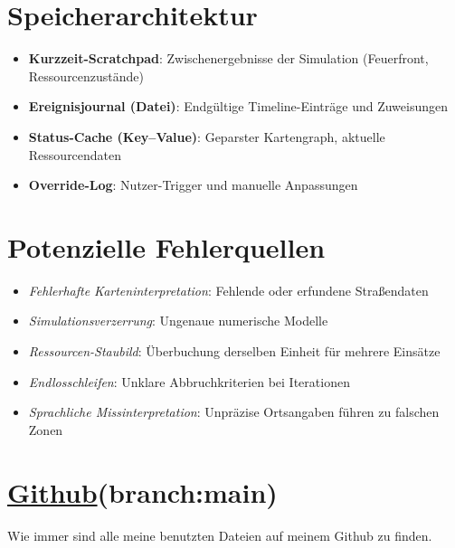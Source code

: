 \documentclass[a4paper,12pt]{scrartcl}
\begin{document}
\section{Speicherarchitektur}
\begin{itemize}
  \item \textbf{Kurzzeit-Scratchpad}: Zwischenergebnisse der Simulation (Feuerfront, Ressourcenzustände)
  \item \textbf{Ereignisjournal (Datei)}: Endgültige Timeline-Einträge und Zuweisungen
  \item \textbf{Status-Cache (Key–Value)}: Geparster Kartengraph, aktuelle Ressourcendaten
  \item \textbf{Override-Log}: Nutzer-Trigger und manuelle Anpassungen
\end{itemize}

\section{Potenzielle Fehlerquellen}
\begin{itemize}
  \item \emph{Fehlerhafte Karteninterpretation}: Fehlende oder erfundene Straßendaten
  \item \emph{Simulationsverzerrung}: Ungenaue numerische Modelle
  \item \emph{Ressourcen-Staubild}: Überbuchung derselben Einheit für mehrere Einsätze
  \item \emph{Endlosschleifen}: Unklare Abbruchkriterien bei Iterationen
  \item \emph{Sprachliche Missinterpretation}: Unpräzise Ortsangaben führen zu falschen Zonen
\end{itemize}

\section*{\href{https://github.com/7hands/Angewandte-Modellierung-25-Colmant}{Github}(branch:main)}
Wie immer sind alle meine benutzten Dateien auf meinem Github zu finden. 
\end{document}
